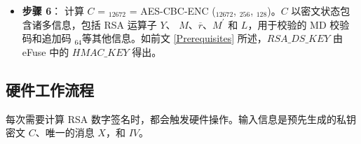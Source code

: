 \documentclass[main\_\_CN.tex]{subfiles}
\begin{document}
\begin{itemize}
    \item {\bfseries 步骤 6}\label{Extract Cipher}：
            计算 \begin{math}C\end{math} = \begin{math}[C]_{12672}\end{math} =
            AES-CBC-ENC (\begin{math}[P]_{12672}\end{math}, \begin{math}[RSA\_DS\_KEY]_{256}\end{math}, \begin{math}[IV]_{128}\end{math})。\begin{math}C\end{math} 以密文状态包含诸多信息，包括 RSA 运算子 \begin{math}Y\end{math}、 \begin{math}M\end{math}、\begin{math}\overline{r}\end{math}、\begin{math}M^{\prime} \end{math} 和 \begin{math}L\end{math}，用于校验的 MD 校验码和追加码 \begin{math}[\beta]_{64} \end{math}等其他信息。如前文 \ref{Prerequisites} 所述，\begin{math}RSA\_DS\_KEY\end{math} 由 eFuse 中的 \begin{math}HMAC\_KEY\end{math} 得出。

\end{itemize}

\subsection{硬件工作流程}\label{DS Operation at the Hardware Level}

每次需要计算 RSA 数字签名时，都会触发硬件操作。输入信息是预先生成的私钥密文 \begin{math}C\end{math}、唯一的消息 \begin{math}X\end{math}，和 \begin{math}IV\end{math}。
\end{document}
